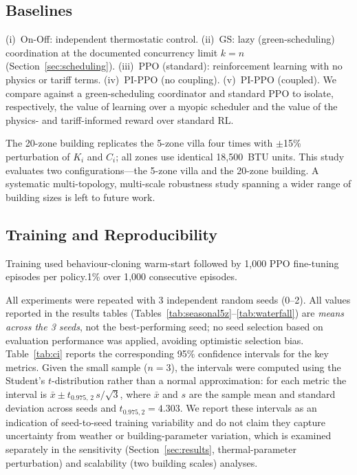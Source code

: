 \documentclass[12pt,a4paper]{article}
\begin{document}
\subsection{Baselines}

(i)~On-Off: independent thermostatic control. (ii)~GS: lazy (green-scheduling) coordination at the documented concurrency limit $k=n$ (Section~\ref{sec:scheduling}). (iii)~PPO (standard): reinforcement learning with no physics or tariff terms. (iv)~PI-PPO (no coupling). (v)~PI-PPO (coupled). We compare against a green-scheduling coordinator and standard PPO to isolate, respectively, the value of learning over a myopic scheduler and the value of the physics- and tariff-informed reward over standard RL.

The 20-zone building replicates the 5-zone villa four times with $\pm$15\% perturbation of $K_i$ and $C_i$; all zones use identical 18{,}500~BTU units. This study evaluates two configurations---the 5-zone villa and the 20-zone building. A systematic multi-topology, multi-scale robustness study spanning a wider range of building sizes is left to future work.

\subsection{Training and Reproducibility}

Training used behaviour-cloning warm-start followed by 1{,}000 PPO fine-tuning episodes per policy.1\% over 1{,}000 consecutive episodes.

All experiments were repeated with 3 independent random seeds (0--2). All values reported in the results tables (Tables~\ref{tab:seasonal5z}--\ref{tab:waterfall}) are \textit{means across the 3 seeds}, not the best-performing seed; no seed selection based on evaluation performance was applied, avoiding optimistic selection bias. Table~\ref{tab:ci} reports the corresponding 95\% confidence intervals for the key metrics. Given the small sample ($n=3$), the intervals were computed using the Student's $t$-distribution rather than a normal approximation: for each metric the interval is $\bar{x} \pm t_{0.975,\,2}\, s/\sqrt{3}$, where $\bar{x}$ and $s$ are the sample mean and standard deviation across seeds and $t_{0.975,2} = 4.303$. We report these intervals as an indication of seed-to-seed training variability and do not claim they capture uncertainty from weather or building-parameter variation, which is examined separately in the sensitivity (Section~\ref{sec:results}, thermal-parameter perturbation) and scalability (two building scales) analyses.
\end{document}
